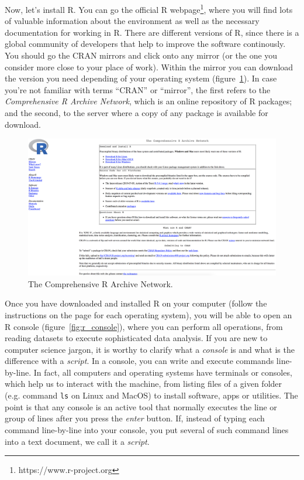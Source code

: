 Now, let's install R. You can go the official R
webpage\footnote{https://www.r-project.org}, where you will find lots
of valuable information about the environment as well as the necessary
documentation for working in R.  There are different versions of R,
since there is a global community of developers that help to improve
the software continously. You should go the CRAN mirrors and click onto
any mirror (or the one you consider more close to your place of
work). Within the mirror you can download the version you need
depending of your operating system (figure~\ref{fig:cran}). In case
you're not familiar with terms ``CRAN'' or ``mirror'', the first
refers to the \textit{Comprehensive R Archive Network}, which is an
online repository of R packages; and the second, to the server where a
copy of any package is available for download.



\begin{figure}
\centering
\includegraphics[width=0.9\linewidth]{figures/ch3_cran}
\caption{The Comprehensive R Archive Network.}
\label{fig:cran}
\end{figure}

Once you have downloaded and installed R on your computer (follow the
instructions on the page for each operating system), you will be able
to open an R console (figure~\ref{fig:r_console}), where you can
perform all operations, from reading datasets to execute sophisticated
data analysis. If you are new to computer science jargon, it is worthy
to clarify what a \textit{console} is and what is the difference with
a \textit{script}. In a console, you can write and execute commands
line-by-line. In fact, all computers and operating systems have
terminals or consoles, which help us to interact with the machine,
from listing files of a given folder (e.g. command \texttt{ls} on
Linux and MacOS) to install software, apps or utilities. The point is
that any console is an active tool that normally executes the line or
group of lines after you press the \textit{enter} button.
If, instead of typing each command line-by-line into your console,
you put several of such command lines into a text document, we call it a \textit{script}.

